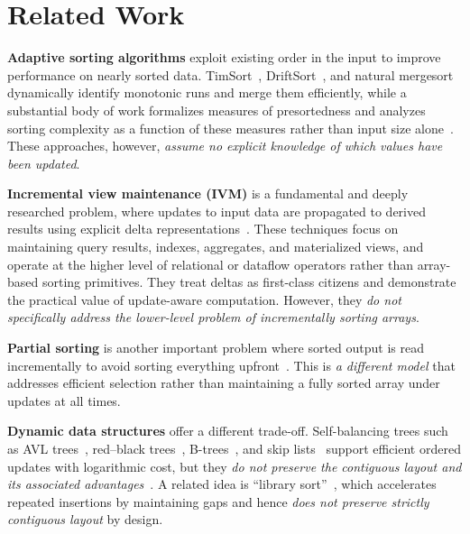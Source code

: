 \section{Related Work}
\label{sec:related}

\textbf{Adaptive sorting algorithms} exploit existing order in the input to improve performance on nearly sorted data. TimSort~\cite{timsort}, DriftSort~\cite{driftsort}, and natural mergesort~\cite{knuth1998art} dynamically identify monotonic runs and merge them efficiently, while a substantial body of work formalizes measures of presortedness and analyzes sorting complexity as a function of these measures rather than input size alone~\cite{5009382}. These approaches, however, \emph{assume no explicit knowledge of which values have been updated}.

\textbf{Incremental view maintenance (IVM)} is a fundamental and deeply researched problem, where updates to input data are propagated to derived results using explicit delta representations~\cite{10.5555/310709.310737, 10.1145/42192.42193, 10.14778/2824032.2824076, 7184878}. These techniques focus on maintaining query results, indexes, aggregates, and materialized views, and operate at the higher level of relational or dataflow operators rather than array-based sorting primitives. They treat deltas as first-class citizens and demonstrate the practical value of update-aware computation. However, they \emph{do not specifically address the lower-level problem of incrementally sorting arrays}.

\textbf{Partial sorting} is another important problem where sorted output is read incrementally to avoid sorting everything upfront~\cite{chambers1971partial, paredes2006optimal}. This is \emph{a different model} that addresses efficient selection rather than maintaining a fully sorted array under updates at all times.

\textbf{Dynamic data structures} offer a different trade-off. Self-balancing trees such as AVL trees~\cite{avl1962}, red--black trees~\cite{4567957}, B-trees~\cite{10.1145/1734663.1734671}, and skip lists~\cite{10.1145/78973.78977} support efficient ordered updates with logarithmic cost, but they \emph{do not preserve the contiguous layout and its associated advantages}~\cite{drepper2007memory,10.1145/1376616.1376712,boncz2005monetdb}. A related idea is ``library sort''~\cite{DBLP:journals/corr/cs-DS-0407003}, which accelerates repeated insertions by maintaining gaps and hence \emph{does not preserve strictly contiguous layout} by design.

